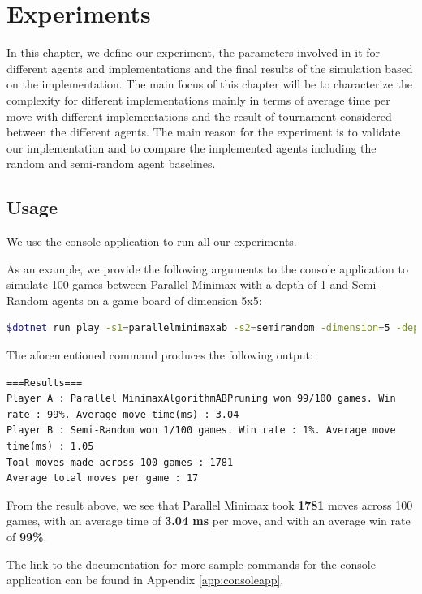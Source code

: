 \chapter{Experiments} \label{Experiments}

In this chapter, we define our experiment, the parameters involved in it for different agents and implementations and the final results of the simulation based on the implementation. The main focus of this chapter will be to characterize the complexity for different implementations mainly in terms of average time per move with different implementations and the result of tournament considered between the different agents. The main reason for the experiment is to validate our implementation and to compare the implemented agents including the random and semi-random agent baselines.

\section{Usage}

We use the console application to run all our experiments.

As an example, we provide the following arguments to the console application to simulate 100 games between Parallel-Minimax with a depth of 1 and Semi-Random agents on a game board of dimension 5x5:

\begin{lstlisting}[language=bash]
$dotnet run play -s1=parallelminimaxab -s2=semirandom -dimension=5 -depth=1 -sim -numsim=100
\end{lstlisting}

The aforementioned command produces the following output:

\begin{lstlisting}
===Results===
Player A : Parallel MinimaxAlgorithmABPruning won 99/100 games. Win rate : 99%. Average move time(ms) : 3.04
Player B : Semi-Random won 1/100 games. Win rate : 1%. Average move time(ms) : 1.05
Toal moves made across 100 games : 1781
Average total moves per game : 17
\end{lstlisting}

From the result above, we see that Parallel Minimax took \textbf{1781} moves across 100 games, with an average time of \textbf{3.04 ms} per move, and with an average win rate of \textbf{99\%}.

The link to the documentation for more sample commands for the console application can be found in Appendix \ref{app:consoleapp}.

